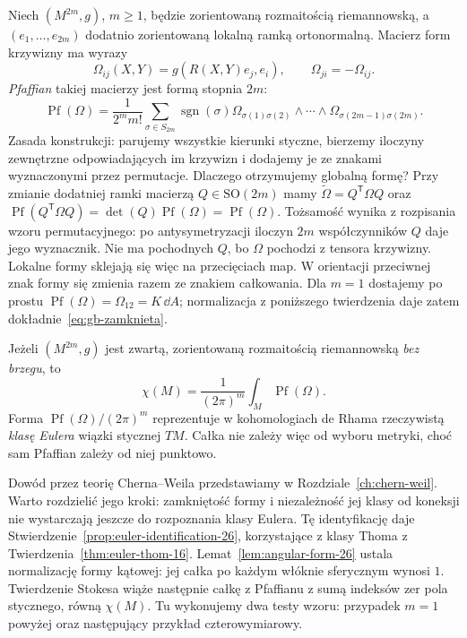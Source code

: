 Niech $(M^{2m},g)$, $m\geq1$, będzie zorientowaną rozmaitością
riemannowską, a $(e_1,\ldots,e_{2m})$ dodatnio zorientowaną
lokalną ramką ortonormalną. Macierz form krzywizny ma wyrazy
\[
 \Omega_{ij}(X,Y)=g(R(X,Y)e_j,e_i),\qquad
 \Omega_{ji}=-\Omega_{ij}.
\]
\emph{Pfaffian} takiej macierzy jest formą stopnia $2m$:
\begin{equation}\label{eq:gb-pfaff-def}
 \operatorname{Pf}(\Omega)=\frac1{2^m m!}
 \sum_{\sigma\in S_{2m}}\operatorname{sgn}(\sigma)
 \Omega_{\sigma(1)\sigma(2)}\wedge\cdots\wedge
 \Omega_{\sigma(2m-1)\sigma(2m)}.
\end{equation}
Zasada konstrukcji: parujemy wszystkie kierunki styczne,
bierzemy iloczyny zewnętrzne odpowiadających im krzywizn
i dodajemy je ze znakami wyznaczonymi przez permutacje.
Dlaczego otrzymujemy globalną formę? Przy zmianie dodatniej
ramki macierzą $Q\in\mathrm{SO}(2m)$ mamy
$\widetilde\Omega=Q^{\mathsf T}\Omega Q$ oraz
$\operatorname{Pf}(Q^{\mathsf T}\Omega Q)
=\det(Q)\operatorname{Pf}(\Omega)=\operatorname{Pf}(\Omega)$.
Tożsamość wynika z rozpisania wzoru permutacyjnego:
po antysymetryzacji iloczyn $2m$ współczynników $Q$
daje jego wyznacznik. Nie ma pochodnych $Q$, bo
$\Omega$ pochodzi z tensora krzywizny. Lokalne formy
sklejają się więc na przecięciach map.
W orientacji przeciwnej znak formy się zmienia razem
ze znakiem całkowania. Dla $m=1$ dostajemy po prostu
$\operatorname{Pf}(\Omega)=\Omega_{12}=K\,\dd A$;
normalizacja z poniższego twierdzenia daje zatem
dokładnie~\eqref{eq:gb-zamknieta}.

\begin{twierdzenie}
\label{thm:chern-gauss-bonnet}
Jeżeli $(M^{2m},g)$ jest zwartą, zorientowaną
rozmaitością riemannowską \emph{bez brzegu}, to
\begin{equation}\label{eq:chern-gauss-bonnet}
 \boxed{\displaystyle
 \chi(M)=\frac1{(2\pi)^m}\int_M
                       \operatorname{Pf}(\Omega).}
\end{equation}
Forma $\operatorname{Pf}(\Omega)/(2\pi)^m$ reprezentuje
w kohomologiach de Rhama rzeczywistą \emph{klasę Eulera}
wiązki stycznej $TM$. Całka nie zależy więc od wyboru
metryki, choć sam Pfaffian zależy od niej punktowo.
\end{twierdzenie}

Dowód przez teorię Cherna--Weila przedstawiamy w
Rozdziale~\ref{ch:chern-weil}. Warto rozdzielić jego kroki:
zamkniętość formy i niezależność jej klasy od koneksji
nie wystarczają jeszcze do rozpoznania klasy Eulera.
Tę identyfikację daje Stwierdzenie~\ref{prop:euler-identification-26},
korzystające z klasy Thoma z Twierdzenia~\ref{thm:euler-thom-16}.
Lemat~\ref{lem:angular-form-26} ustala normalizację formy kątowej:
jej całka po każdym włóknie sferycznym wynosi $1$.
Twierdzenie Stokesa wiąże następnie całkę z Pfaffianu
z sumą indeksów zer pola stycznego, równą $\chi(M)$.
Tu wykonujemy dwa testy wzoru: przypadek $m=1$ powyżej
oraz następujący przykład czterowymiarowy.

